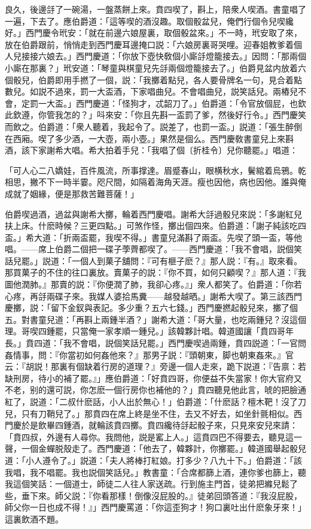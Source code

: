 良久，後邊㧱了一碗湯，一盤蒸餅上來。賁四喫了，斟上，陪衆人喫酒。書童唱了一遍，下去了。應伯爵道：「這等喫的酒沒趣。取個骰盆兒，俺們行個令兒喫纔好。」西門慶令玳安：「就在前邊六娘屋裏，取個骰盆來。」不一時，玳安取了來，放在伯爵跟前，悄悄走到西門慶耳邊掩口説：「六娘房裏哥哭哩。迎春姐教爹着個人兒接接六娘去。」西門慶道：「你放下壺快敎個小廝㧱燈籠接去。」因問：「那兩個小廝在那裏？」玳安道：「琴童與棋童兒先㧱兩個燈籠接去了。」伯爵見盆内放着六個骰兒，伯爵即用手撚了一個，説：「我擲着點兒，各人要骨牌名一句，見合着點數兒。如説不過來，罰一大盃酒，下家唱曲兒。不會唱曲兒，説笑話兒。兩樁兒不會，定罰一大盃。」西門慶道：「怪狗才，忒韶刀了。」伯爵道：「令官放個屁，也欽此欽遵，你管我怎的？」呌來安：「你且先斟一盃罰了爹，然後好行令。」西門慶笑而飲之。伯爵道：「衆人聽着，我起令了。説差了，也罰一盃。」説道：「張生醉倒在西廂。喫了多少酒，一大壺，兩小壺。」果然是個么。西門慶敎書童兒上來斟酒，該下家謝希大唱。希大拍着手兒：「我唱了個〔折桂令〕兒你聽罷。」唱道：

\begin{myquote}
「可人心二八嬌娃，百件風流，所事撑達。眉蹙春山，眼横秋水，鬢綰着烏鴉。乾相思，撇不下一時半霎。咫尺間，如隔着海角天涯。瘦也因他，病也因他。誰與俺成就了姻緣，便是那救苦難菩薩！」
\end{myquote}

伯爵喫過酒，過盆與謝希大擲，輪着西門慶唱。謝希大㧱過骰兒來説：「多謝紅兒扶上床。什麽時候？三更四點。」可煞作怪，擲出個四來。伯爵道：「謝子純該吃四盃。」希大道：「折兩盃罷，我喫不得。」書童兒滿斟了兩盃。先喫了頭一盃，等他唱。——席上伯爵二個把一碟子荸薺都喫了。——西門慶道：「我不會唱，説個笑話兒罷。」説道：「一個人到菓子舖問：『可有榧子麽？』那人説：『有。』取來看。那買菓子的不住的往口裏放。賣菓子的説：『你不買，如何只顧喫？』那人道：『我圖他潤肺。』那賣的説：『你便潤了肺，我卻心疼。』」衆人都笑了。伯爵道：「你若心疼，再㧱兩碟子來。我媒人婆拾馬糞——越發越晒。」謝希大喫了。第三該西門慶擲，説：「留下金釵與表記。多少重？五六七錢。」西門慶撚起骰兒來，擲了個五。對書童兒道：「再斟上兩鍾半酒？」謝希大道：「哥大量，也吃兩鍾兒？沒這個理。哥喫四鍾罷，只當俺一家孝順一鍾兒。」該韓夥計唱。韓道國讓「賁四哥年長。」賁四道：「我不會唱，説個笑話兒罷。」西門慶喫過兩鍾，賁四説道：「一官問姦情事，問：『你當初如何姦他來？』那男子説：『頭朝東，脚也朝東姦來。』官云：『胡説！那裏有個缺着行房的道理？』旁邊一個人走來，跪下説道：『告禀：若缺刑房，待小的補了罷。』」應伯爵道：「好賁四哥，你便益不失當家！你大官府又不老，别的還可説，你怎麽一個行房你也補他的？」賁四聽見他此言，唬的把臉通紅了，説道：「二叔什麽話，小人出於無心！」伯爵道：「什麽話？檀木靶！沒了刀兒，只有刀鞘兒了。」那賁四在席上終是坐不住，去又不好去，如坐針氈相似。西門慶於是飲畢四鍾酒，就輪該賁四擲。賁四纔待㧱起骰子來，只見來安兒來請：「賁四叔，外邊有人尋你。我問他，説是窰上人。」這賁四巴不得要去，聽見這一聲，一個金蟬脱殼走了。西門慶道：「他去了，韓夥計，你擲罷。」韓道國舉起骰兒道：「小人遵令了。」説道：「夫人將棒打紅娘。打多少？八九十下。」伯爵道：「該我唱，我不唱罷。我也説個笑話兒。」教書童：「合席都篩上酒，連你爹也篩上，聽我這個笑話：一個道士，師徒二人往人家送疏。行到施主門首，徒弟把縧兒鬆了些，垂下來。師父説：『你看那樣！倒像沒屁股的。』徒弟回頭答道：『我沒屁股，師父你一日也成不得！』」西門慶罵道：「你這歪狗才！狗口裏吐出什麽象牙來！」這裏飲酒不題。

